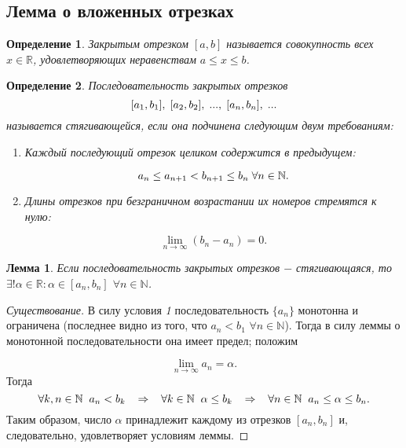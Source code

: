 \documentclass{article}
\newtheorem*{lemma}{Лемма}
\newtheorem{definition}{Определение}[section]
\begin{document}
\subsection{Лемма о вложенных отрезках}

\begin{definition}
Закрытым отрезком \([a, b]\) называется совокупность всех \(x \in \mathbb{R}\), удовлетворяющих неравенствам \(a \leq x \leq b\).
\end{definition}

\begin{definition}
Последовательность закрытых отрезков
\[
[a_1, b_1], \hspace{1mm} [a_2, b_2], \hspace{1mm} ..., \hspace{1mm} [a_n, b_n], \hspace{1mm} ...
\]
называется стягивающейся, если она подчинена следующим двум требованиям:
\begin{enumerate}
    \item Каждый последующий отрезок целиком содержится в предыдущем:

    \[a_n \leq a_{n + 1} < b_{n + 1} \leq b_n \hspace{1mm} \forall n \in \mathbb{N}.\]

    \item Длины отрезков при безграничном возрастании их номеров стремятся к нулю:

    \[\lim_{n \to \infty} (b_n - a_n) = 0.\]

\end{enumerate}

\end{definition}

\begin{lemma}
Если последовательность закрытых отрезков \(-\) стягивающаяся, то \(\exists! \alpha \in \mathbb{R} : \alpha \in [a_n, b_n]\) \(\forall n \in \mathbb{N}\).
\end{lemma}

\begin{proof}[Существование]
В силу условия \textit{1} последовательность \(\{a_n\}\) монотонна и ограничена (последнее видно из того, что \(a_n < b_1\) \(\forall n \in \mathbb{N}\)). Тогда в силу леммы о монотонной последовательности она имеет предел; положим

\[\lim_{n \to \infty} a_n = \alpha.\]
Тогда
\[
\forall k, n \in \mathbb{N} \hspace{2mm}
a_n < b_k
\hspace{3mm} \Rightarrow \hspace{3mm}
\forall k \in \mathbb{N} \hspace{2mm}
\alpha \leq b_k
\hspace{3mm} \Rightarrow \hspace{3mm}
\forall n \in \mathbb{N} \hspace{2mm}
a_n \leq \alpha \leq b_n.
\]
Таким образом, число \(\alpha\) принадлежит каждому из отрезков \([a_n, b_n]\) и, следовательно, удовлетворяет условиям леммы.
\end{proof}
\end{document}
